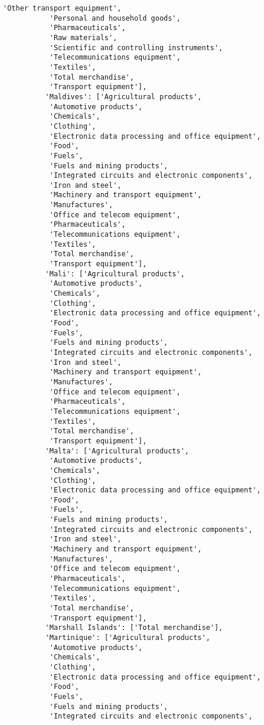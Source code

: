 \documentclass[11pt]{article}
\begin{document}
\begin{Verbatim}[commandchars=\\\{\}]
           'Other transport equipment',
           'Personal and household goods',
           'Pharmaceuticals',
           'Raw materials',
           'Scientific and controlling instruments',
           'Telecommunications equipment',
           'Textiles',
           'Total merchandise',
           'Transport equipment'],
          'Maldives': ['Agricultural products',
           'Automotive products',
           'Chemicals',
           'Clothing',
           'Electronic data processing and office equipment',
           'Food',
           'Fuels',
           'Fuels and mining products',
           'Integrated circuits and electronic components',
           'Iron and steel',
           'Machinery and transport equipment',
           'Manufactures',
           'Office and telecom equipment',
           'Pharmaceuticals',
           'Telecommunications equipment',
           'Textiles',
           'Total merchandise',
           'Transport equipment'],
          'Mali': ['Agricultural products',
           'Automotive products',
           'Chemicals',
           'Clothing',
           'Electronic data processing and office equipment',
           'Food',
           'Fuels',
           'Fuels and mining products',
           'Integrated circuits and electronic components',
           'Iron and steel',
           'Machinery and transport equipment',
           'Manufactures',
           'Office and telecom equipment',
           'Pharmaceuticals',
           'Telecommunications equipment',
           'Textiles',
           'Total merchandise',
           'Transport equipment'],
          'Malta': ['Agricultural products',
           'Automotive products',
           'Chemicals',
           'Clothing',
           'Electronic data processing and office equipment',
           'Food',
           'Fuels',
           'Fuels and mining products',
           'Integrated circuits and electronic components',
           'Iron and steel',
           'Machinery and transport equipment',
           'Manufactures',
           'Office and telecom equipment',
           'Pharmaceuticals',
           'Telecommunications equipment',
           'Textiles',
           'Total merchandise',
           'Transport equipment'],
          'Marshall Islands': ['Total merchandise'],
          'Martinique': ['Agricultural products',
           'Automotive products',
           'Chemicals',
           'Clothing',
           'Electronic data processing and office equipment',
           'Food',
           'Fuels',
           'Fuels and mining products',
           'Integrated circuits and electronic components',

\end{Verbatim}
\end{document}
